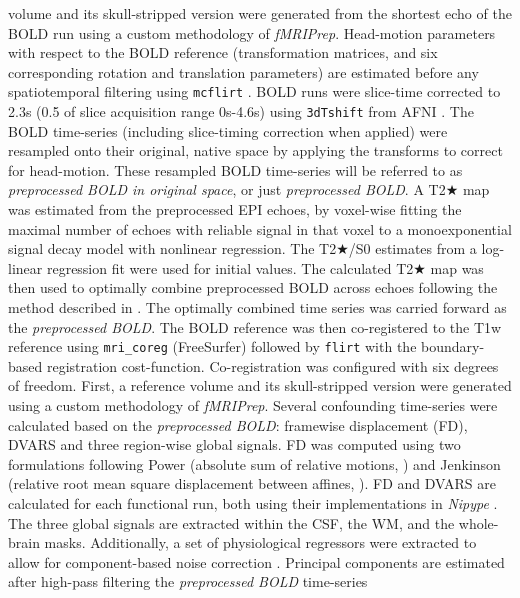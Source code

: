 \documentclass[
]{article}
\begin{document}
\begin{description}
volume and its skull-stripped version were generated from the shortest
echo of the BOLD run using a custom methodology of \emph{fMRIPrep}.
Head-motion parameters with respect to the BOLD reference
(transformation matrices, and six corresponding rotation and translation
parameters) are estimated before any spatiotemporal filtering using
\texttt{mcflirt} \citep[FSL 6.0.5.1:57b01774,][]{mcflirt}. BOLD runs
were slice-time corrected to 2.3s (0.5 of slice acquisition range
0s-4.6s) using \texttt{3dTshift} from AFNI
\citep[RRID:SCR\_005927]{afni}. The BOLD time-series (including
slice-timing correction when applied) were resampled onto their
original, native space by applying the transforms to correct for
head-motion. These resampled BOLD time-series will be referred to as
\emph{preprocessed BOLD in original space}, or just \emph{preprocessed
BOLD}. A T2★ map was estimated from the preprocessed EPI echoes, by
voxel-wise fitting the maximal number of echoes with reliable signal in
that voxel to a monoexponential signal decay model with nonlinear
regression. The T2★/S0 estimates from a log-linear regression fit were
used for initial values. The calculated T2★ map was then used to
optimally combine preprocessed BOLD across echoes following the method
described in \citep{posse_t2s}. The optimally combined time series was
carried forward as the \emph{preprocessed BOLD}. The BOLD reference was
then co-registered to the T1w reference using \texttt{mri\_coreg}
(FreeSurfer) followed by \texttt{flirt} \citep[FSL
6.0.5.1:57b01774,][]{flirt} with the boundary-based registration
\citep{bbr} cost-function. Co-registration was configured with six
degrees of freedom. First, a reference volume and its skull-stripped
version were generated using a custom methodology of \emph{fMRIPrep}.
Several confounding time-series were calculated based on the
\emph{preprocessed BOLD}: framewise displacement (FD), DVARS and three
region-wise global signals. FD was computed using two formulations
following Power (absolute sum of relative motions,
\citet{power_fd_dvars}) and Jenkinson (relative root mean square
displacement between affines, \citet{mcflirt}). FD and DVARS are
calculated for each functional run, both using their implementations in
\emph{Nipype} \citep[following the definitions by][]{power_fd_dvars}.
The three global signals are extracted within the CSF, the WM, and the
whole-brain masks. Additionally, a set of physiological regressors were
extracted to allow for component-based noise correction
\citep[\emph{CompCor},][]{compcor}. Principal components are estimated
after high-pass filtering the \emph{preprocessed BOLD} time-series

\end{description}
\end{document}
